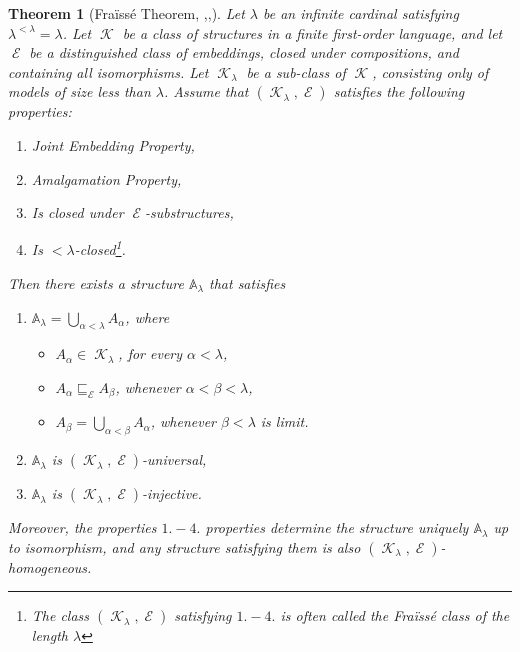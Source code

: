 \documentclass[11pt]{amsart}
\newtheorem{thm}{Theorem}[section]
\theoremstyle{definition}
\DeclareMathOperator{\K}{\mathcal K}
\DeclareMathOperator{\E}{\mathcal E}
\begin{document}
\begin{thm}[Fra\"iss\'e Theorem, \cite{fraisse},\cite{jonsson},\cite{kub}]\label{fraissethm}
Let $\lambda$ be an infinite cardinal satisfying $\lambda^{<\lambda}=\lambda$. Let $\K$ be a class of structures in a finite first-order language, and let $\E$ be a distinguished class of embeddings, closed under compositions, and containing all isomorphisms. Let $\K_\lambda$ be a sub-class of $\K$, consisting only of models of size less than $\lambda$. Assume that $(\K_\lambda,\E)$ satisfies the following properties:
\begin{enumerate}
    \item Joint Embedding Property,
    \item Amalgamation Property,
    \item Is closed under $\E$-substructures,
    \item Is $<\lambda$-closed\footnote{The class $(\K_\lambda,\E)$ satisfying $1.-4.$ is often called the \emph{Fra\"iss\'e class of the length $\lambda$}}.
\end{enumerate}


    Then there exists a structure $\mathbb A_\lambda$ that satisfies
    \begin{enumerate}
        \item[a)] $\mathbb A_\lambda=\bigcup\limits_{\alpha<\lambda}A_\alpha$,
        where 
            \begin{itemize}
                \item $A_\alpha \in \K_\lambda$, for every $\alpha<\lambda$,
                \item $A_\alpha \sqsubseteq_{\E} A_\beta$, whenever $\alpha<\beta<\lambda$,
                \item $A_\beta=\bigcup\limits_{\alpha<\beta}A_\alpha$, whenever $\beta<\lambda$ is limit.
            \end{itemize}
         \item[b)] $\mathbb A_\lambda$ is $(\K_\lambda,\E)$-universal,
         \item[c)] $\mathbb A_\lambda$ is $(\K_\lambda,\E)$-injective.
    \end{enumerate}
    Moreover, the properties $1.-4.$ properties determine the structure uniquely $\mathbb A_\lambda$ up to isomorphism, and any structure satisfying them is also $(\K_\lambda,\E)$-homogeneous.
\end{thm}
\end{document}
